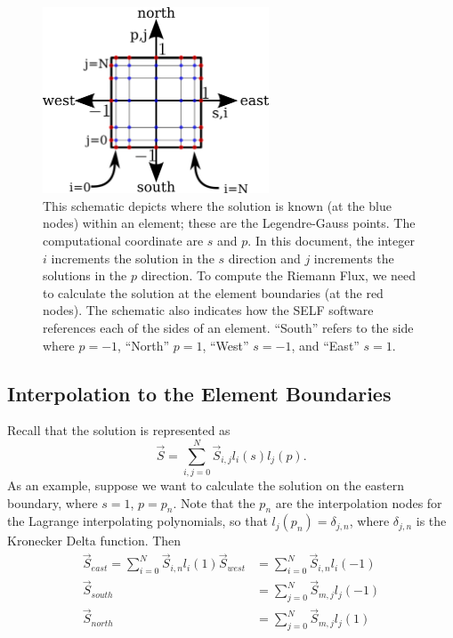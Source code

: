 \documentclass{softwaremanual}
\begin{document}
\begin{figure}
\begin{center}
\includegraphics[width=0.6\textwidth]{../figures/geometry/elementsimple.png}
\caption{This schematic depicts where the solution is known (at the blue nodes) within an element; these are the Legendre-Gauss points. The computational coordinate are $s$ and $p$. In this document, the integer $i$ increments the solution in the $s$ direction and $j$ increments the solutions in the $p$ direction. To compute the Riemann Flux, we need to calculate the solution at the element boundaries (at the red nodes). The schematic also indicates how the SELF software references each of the sides of an element. ``South'' refers to the side where $p=-1$, ``North'' $p=1$, ``West'' $s=-1$, and ``East'' $s=1$.}
\end{center}
\end{figure}

\subsection{Interpolation to the Element Boundaries}
Recall that the solution is represented as
\begin{equation}
\vec{S} =  \sum_{i,j=0}^N \vec{S}_{i,j} l_i(s) l_j(p).
\end{equation}
As an example, suppose we want to calculate the solution on the eastern boundary, where $s = 1$, $p = p_n$. Note that the $p_n$ are the interpolation nodes for the Lagrange interpolating polynomials, so that $l_j(p_n) = \delta_{j,n}$, where $\delta_{j,n}$ is the Kronecker Delta function. Then
\begin{subequations}
\begin{align}
 \vec{S}_{east} = \sum_{i=0}^N \vec{S}_{i,n} l_i(1)
 \vec{S}_{west} &= \sum_{i=0}^N \vec{S}_{i,n} l_i(-1) \\
 \vec{S}_{south} &= \sum_{j=0}^N \vec{S}_{m,j} l_j(-1) \\
 \vec{S}_{north} &= \sum_{j=0}^N \vec{S}_{m,j} l_j(1) \label{eq:boundaryInterp}
\end{align}
\end{subequations}
\end{document}
